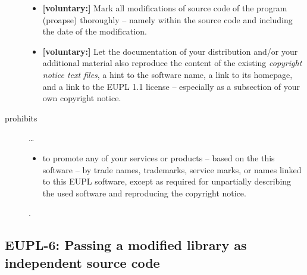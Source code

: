 \begin{description}
\begin{itemize}
  \item \textbf{[voluntary:]} Mark all modifications of source code of the
  program (proapse) thoroughly -- namely within the
  source code and including the date of the modification.
 
  \item \textbf{[voluntary:]} Let the documentation of your distribution and/or
  your additional material  also reproduce the content of the existing
  \emph{copyright notice text files}, a hint to the software name, a link to its
  homepage, and a link to the EUPL 1.1 license -- especially as a subsection of
  your own copyright notice.


\end{itemize}

\item[prohibits] \ldots
\begin{itemize}
  \item to promote any of your services or products – based on the this software
  – by trade names, trademarks, service marks, or names linked to this EUPL
  software, except as required for unpartially describing the used software and
  reproducing the copyright notice.
\end{itemize}.

\end{description}

\subsection{EUPL-6: Passing a modified library as independent source code}
\label{OSUC-08-EUPL}


